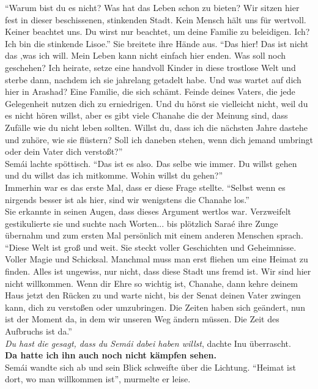 ``Warum bist du es nicht? Was hat das Leben schon zu bieten? Wir sitzen hier fest in dieser 
beschissenen, stinkenden Stadt. Kein Mensch hält uns für wertvoll. Keiner beachtet uns. Du wirst 
nur beachtet, um deine Familie zu beleidigen. Ich? Ich bin die stinkende Lisoe.'' Sie breitete ihre 
Hände aus. ``Das hier! Das ist nicht das ,was ich will. Mein Leben kann nicht einfach hier enden. 
Was soll noch geschehen? Ich heirate, setze eine handvoll Kinder in diese trostlose Welt und sterbe 
dann, nachdem ich sie jahrelang getadelt habe. Und was wartet auf dich hier in Arashad? Eine 
Familie, die sich schämt. Feinde deines Vaters, die jede Gelegenheit nutzen dich zu erniedrigen. 
Und du hörst sie vielleicht nicht, weil du es nicht hören willst, aber es gibt viele Chanahe die 
der Meinung sind, dass Zufälle wie du nicht leben sollten. Willst du, dass ich die nächsten Jahre 
dastehe und zuhöre, wie sie flüstern? Soll ich daneben stehen, wenn dich jemand umbringt oder dein 
Vater dich verstoßt?''\\
Semái lachte spöttisch. ``Das ist es also. Das selbe wie immer. Du willst gehen und du willst das 
ich mitkomme. Wohin willst du gehen?''\\
Immerhin war es das erste Mal, dass er diese Frage stellte. ``Selbst wenn es nirgends besser ist 
als hier, sind wir wenigstens die Chanahe los.''\\
Sie erkannte in seinen Augen, dass dieses Argument wertlos war. Verzweifelt gestikulierte sie und 
suchte nach Worten... bis plötzlich Saraé ihre Zunge übernahm und zum ersten Mal persönlich mit 
einem anderen Menschen sprach. ``Diese Welt ist groß und weit. Sie steckt voller Geschichten und 
Geheimnisse. Voller Magie und Schicksal. Manchmal muss man erst fliehen um eine Heimat zu finden. 
Alles ist ungewiss, nur nicht, dass diese Stadt uns fremd ist. Wir sind hier nicht willkommen. Wenn 
dir Ehre so wichtig ist, Chanahe, dann kehre deinem Haus jetzt den Rücken zu und warte nicht, bis 
der Senat deinen Vater zwingen kann, dich zu verstoßen oder umzubringen. Die Zeiten haben sich 
geändert, nun ist der Moment da, in dem wir unseren Weg ändern müssen. Die Zeit des Aufbruchs ist 
da.''\\
\textit{Du hast die gesagt, dass du Semái dabei haben willst}, dachte Inu überrascht.\\
\textbf{Da hatte ich ihn auch noch nicht kämpfen sehen.}\\
Semái wandte sich ab und sein Blick schweifte über die Lichtung. ``Heimat ist dort, wo man 
willkommen ist'', murmelte er leise.\\
